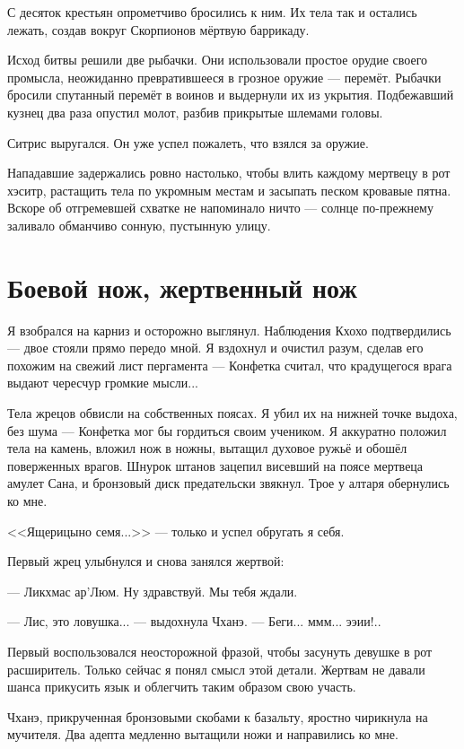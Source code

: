 С десяток крестьян опрометчиво бросились к ним.
Их тела так и остались лежать, создав вокруг Скорпионов мёртвую баррикаду.

Исход битвы решили две рыбачки.
Они использовали простое орудие своего промысла, неожиданно превратившееся в грозное оружие --- перемёт.
Рыбачки бросили спутанный перемёт в воинов и выдернули их из укрытия.
Подбежавший кузнец два раза опустил молот, разбив прикрытые шлемами головы.

Ситрис выругался.
Он уже успел пожалеть, что взялся за оружие.

Нападавшие задержались ровно настолько, чтобы влить каждому мертвецу в рот хэситр, растащить тела по укромным местам и засыпать песком кровавые пятна.
Вскоре об отгремевшей схватке не напоминало ничто --- солнце по-прежнему заливало обманчиво сонную, пустынную улицу.

\section{Боевой нож, жертвенный нож}

Я взобрался на карниз и осторожно выглянул.
Наблюдения Кхохо подтвердились --- двое стояли прямо передо мной.
Я вздохнул и очистил разум, сделав его похожим на свежий лист пергамента --- Конфетка считал, что крадущегося врага выдают чересчур громкие мысли...

Тела жрецов обвисли на собственных поясах.
Я убил их на нижней точке выдоха, без шума --- Конфетка мог бы гордиться своим учеником.
Я аккуратно положил тела на камень, вложил нож в ножны, вытащил духовое ружьё и обошёл поверженных врагов.
Шнурок штанов зацепил висевший на поясе мертвеца амулет Сана, и бронзовый диск предательски звякнул.
Трое у алтаря обернулись ко мне.

<<Ящерицыно семя...>> --- только и успел обругать я себя.

Первый жрец улыбнулся и снова занялся жертвой:

--- Ликхмас ар'Люм.
Ну здравствуй.
Мы тебя ждали.

--- Лис, это ловушка... --- выдохнула Чханэ.
--- Беги... ммм... ээии!..

Первый воспользовался неосторожной фразой, чтобы засунуть девушке в рот расширитель.
Только сейчас я понял смысл этой детали.
Жертвам не давали шанса прикусить язык и облегчить таким образом свою участь.

Чханэ, прикрученная бронзовыми скобами к базальту, яростно чирикнула на мучителя.
Два адепта медленно вытащили ножи и направились ко мне.

